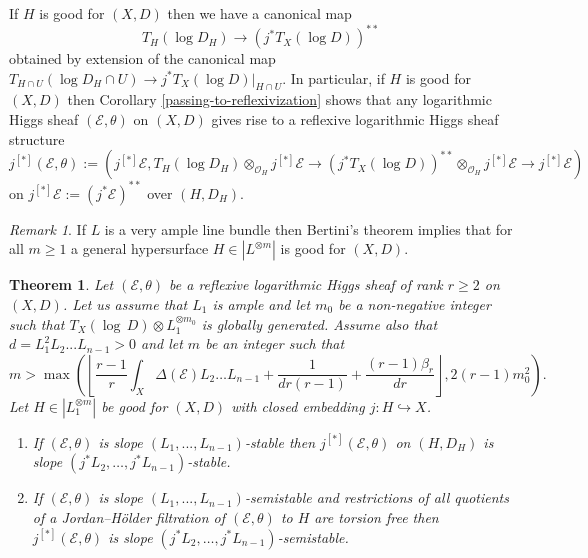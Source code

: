 \documentclass[12pt]{article}
\theoremstyle{plain}
\newtheorem{Theorem}[Thm]{\sc Theorem}
\theoremstyle{definition}
\theoremstyle{remark}
\newtheorem{Remark}[Thm]{Remark}
\newcommand{\cE}{{\mathcal E}}
\newcommand{\cO}{{\mathcal O}}
\begin{document}
If $H$ is good for $(X, D)$ then we have a canonical map
$$T_H(\log D_H)\to (j^*T_X(\log D))^{**}$$
obtained by extension of the canonical map $T_{H\cap U}(\log D_H\cap U)\to j^*T_X(\log D)|_{H\cap U}$.
In particular, if $H$ is good for $(X, D)$ then Corollary \ref{passing-to-reflexivization} shows that any
logarithmic Higgs sheaf $(\cE , \theta )$  on $(X,D)$ gives rise to a reflexive logarithmic Higgs sheaf structure 
$$j^{[*]}(\cE , \theta ):= (j^{[*]} \cE, T_H(\log D_H)\otimes _{\cO_H} j^{[*]} \cE \to (j^*T_X(\log D))^{**}\otimes _{\cO_H} j^{[*]} \cE\to j^{[*]} \cE) $$
on $j^{[*]} \cE:= (j^*\cE )^{**}$ over $(H, D_H)$. 

\medskip

\begin{Remark}
	If $L$ is a very ample line bundle then  Bertini's theorem implies that for all $m\ge 1$ a general hypersurface $H\in |L^{\otimes m}|$ is good for $(X,D)$.
\end{Remark}

\medskip 


\begin{Theorem}	\label{restriction-for-Higgs}
	Let  $(\cE , \theta )$ be a reflexive logarithmic Higgs sheaf of rank $r\ge 2$ on $(X,D)$. 
	Let us assume that $L_1$ is ample and let $m_0$ be a non-negative integer such that $T_X (\log \, D)\otimes L_1^{\otimes m_0}$ is globally generated. Assume also that  $d=L_1^2L_2...L_{n-1}>0$ and let   $m$ be an integer such that
	$$m>\max \left(\left\lfloor \frac{r-1}{ r}\int_X\Delta (\cE)L_2\dots L_{n-1} +\frac{1}{dr(r-1)}
	+\frac{(r-1)\beta _r}{dr}\right\rfloor , 2(r-1)m_0^2 \right).$$
	Let $H\in |L_1^{\otimes m}|$ be good for $(X,D)$ with closed embedding $j:H\hookrightarrow X$.
	\begin{enumerate}
		\item If  $(\cE , \theta )$ is slope $(L_1,...,L_{n-1})$-stable then  $j^{[*]}(\cE , \theta )$ on $(H,D_H)$ is  slope $(j^*L_2,\dots ,j^*L_{n-1})$-stable.
		\item If  $(\cE , \theta )$ is slope $(L_1,...,L_{n-1})$-semistable and restrictions of all quotients of a Jordan--H\"older filtration of $(\cE , \theta )$ to $H$ are torsion free
		then  $j^{[*]}(\cE , \theta )$ is  slope $(j^*L_2,\dots ,j^*L_{n-1})$-semistable.  
	\end{enumerate}
\end{Theorem}
\end{document}
